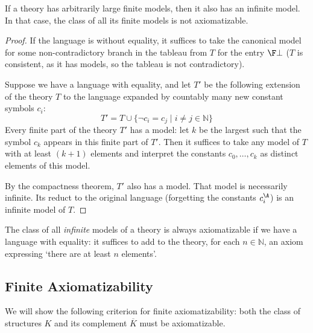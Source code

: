\begin{theorem}
    If a theory has arbitrarily large finite models, then it also has an infinite model. In that case, the class of all its finite models is not axiomatizable.
\end{theorem}
\begin{proof}
    If the language is without equality, it suffices to take the canonical model for some non-contradictory branch in the tableau from $T$ for the entry $\F\bot$ ($T$ is consistent, as it has models, so the tableau is not contradictory).     
    
    Suppose we have a language with equality, and let $T'$ be the following extension of the theory $T$ to the language expanded by countably many new constant symbols $c_i$:
    $$
    T'=T \cup \{\neg c_i = c_j \mid i \neq j \in \mathbb{N}\}
    $$
    Every finite part of the theory $T'$ has a model: let $k$ be the largest such that the symbol $c_k$ appears in this finite part of $T'$. Then it suffices to take any model of $T$ with at least $(k+1)$ elements and interpret the constants $c_0, \dots, c_k$ as distinct elements of this model.

    By the compactness theorem, $T'$ also has a model. That model is necessarily infinite. Its reduct to the original language (forgetting the constants $c_i^\A$) is an infinite model of $T$.
\end{proof}

\begin{remark}
    The class of all \emph{infinite} models of a theory is always axiomatizable if we have a language with equality: it suffices to add to the theory, for each $n \in \mathbb{N}$, an axiom expressing `there are at least $n$ elements'.
\end{remark}

\subsection{Finite Axiomatizability}

We will show the following criterion for finite axiomatizability: both the class of structures $K$ and its complement $\overline{K}$ must be axiomatizable.

